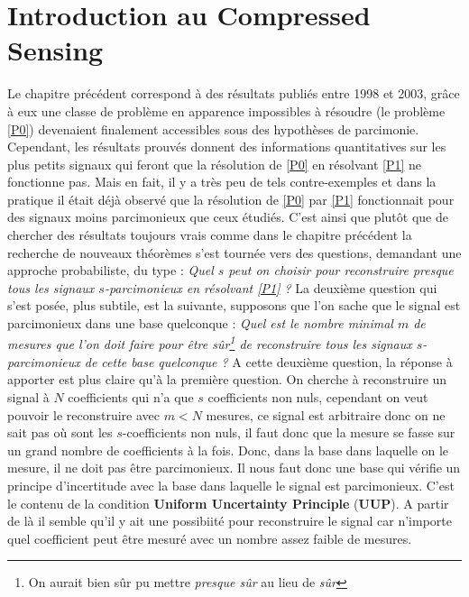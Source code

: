 \section{Introduction au Compressed Sensing}
Le chapitre précédent correspond à des résultats publiés entre 1998 et 2003, grâce à eux une classe de problème en apparence impossibles à résoudre (le problème \ref{P0}) devenaient finalement accessibles sous des hypothèses de parcimonie. 
Cependant, les résultats prouvés donnent des informations quantitatives sur les plus petits signaux qui feront que la résolution de \ref{P0} en résolvant \ref{P1} ne fonctionne pas.
Mais en fait, il y a très peu de tels contre-exemples et dans la pratique il était déjà observé que la résolution de \ref{P0} par \ref{P1} fonctionnait pour des signaux moins parcimonieux que ceux étudiés.
C'est ainsi que plutôt que de chercher des résultats toujours vrais comme dans le chapitre précédent la recherche de nouveaux théorèmes s'est tournée vers des questions, demandant une approche probabiliste, du type : 
\newline
\textit{Quel $s$ peut on choisir pour reconstruire presque tous les signaux $s$-parcimonieux en résolvant \ref{P1} ?}
\newline 
La deuxième question qui s'est posée, plus subtile, est la suivante, supposons que l'on sache que le signal est parcimonieux dans une base quelconque : 
\newline
\textit{Quel est le nombre minimal $m$ de mesures que l'on doit faire pour être sûr\footnote{On aurait bien sûr pu mettre \emph{presque sûr} au lieu de \emph{sûr}} de reconstruire tous les signaux $s$-parcimonieux de cette base quelconque ?}
\newline
A cette deuxième question, la réponse à apporter est plus claire qu'à la première question.
On cherche à reconstruire un signal à $N$ coefficients qui n'a que $s$ coefficients non nuls, cependant on veut pouvoir le reconstruire avec $m<N$ mesures, ce signal est arbitraire donc on ne sait pas où sont les $s$-coefficients non nuls, il faut donc que la mesure se fasse sur un grand nombre de coefficients à la fois.
Donc, dans la base dans laquelle on le mesure, il ne doit pas être parcimonieux.
Il nous faut donc une base qui vérifie un principe d'incertitude avec la base dans laquelle le signal est parcimonieux.
C'est le contenu de la condition \textbf{Uniform Uncertainty Principle} (\textbf{UUP}).
\newline
A partir de là il semble qu'il y ait une possibiité pour reconstruire le signal car n'importe quel coefficient peut être mesuré avec un nombre assez faible de mesures. 
